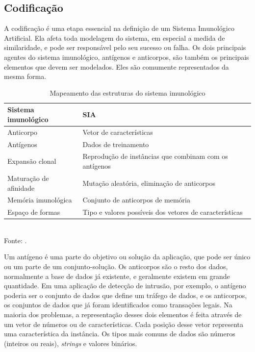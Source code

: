\subsection{Codificação}

A codificação é uma etapa essencial na definição de um Sistema Imunológico Artificial. Ela afeta toda modelagem do sistema, em especial a medida de similaridade, e pode ser responsável pelo seu sucesso ou falha. Os dois principais agentes do sistema imunológico, antígenos e anticorpos, são também os principais elementos que devem ser modelados. Eles são comumente representados da mesma forma.

\vspace{0.5cm}
\begin{table}[h]
    \centering
    \caption{Mapeamento das estruturas do sistema imunológico}
    \label{tab:ais_map}
    \vspace{0.5cm}
    \begin{tabular}{l l}
        \hline
        Sistema imunológico     & SIA                                                     \\
        \hline
        Anticorpo               & Vetor de características                                \\
        Antígenos               & Dados de treinamento                                    \\
        Expansão clonal         & Reprodução de instâncias que combinam com os antígenos  \\
        Maturação de afinidade  & Mutação aleatória, eliminação de anticorpos             \\
        Memória imunológica     & Conjunto de anticorpos de memória                       \\
        Espaço de formas        & Tipo e valores possíveis dos vetores de características \\
        \hline
    \end{tabular}
    \vspace{0.5cm}
    \\ Fonte: \cite{Andrew2003}.
\end{table}
\vspace{0.5cm}

Um antígeno é uma parte do objetivo ou solução da aplicação, que pode ser único ou um parte de um conjunto-solução. Os anticorpos são o resto dos dados, normalmente a base de dados já existente, e geralmente existem em grande quantidade. Em uma aplicação de detecção de intrusão, por exemplo, o antígeno poderia ser o conjunto de dados que define um tráfego de dados, e os anticorpos, os conjuntos de dados que já foram identificados como transações legais. Na maioria dos problemas, a representação desses dois elementos é feita através de um vetor de números ou de características. Cada posição desse vetor representa uma característica da instância. Os tipos mais comuns de dados são números (inteiros ou reais), \emph{strings} e valores binários.

